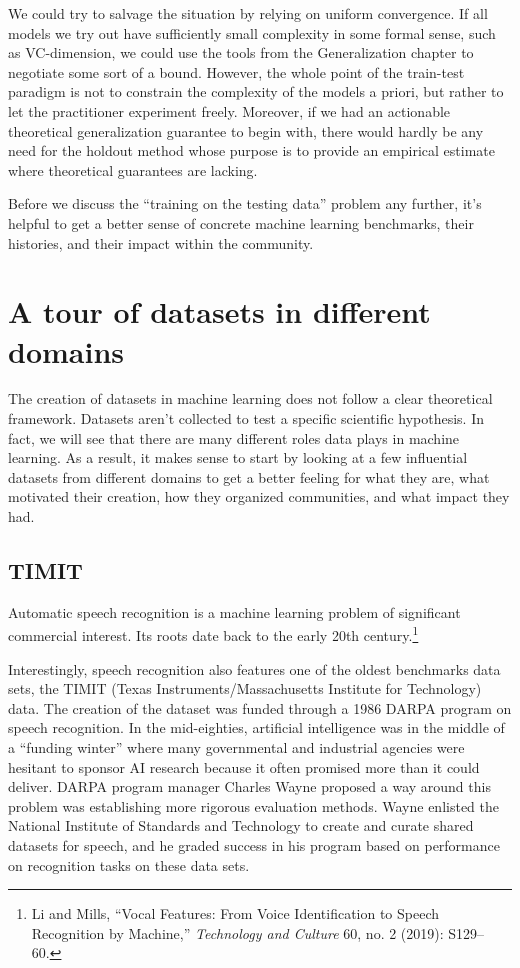 \documentclass{tufte-book}
\begin{document}
We could try to salvage the situation by relying on uniform convergence.
If all models we try out have sufficiently small complexity in some
formal sense, such as VC-dimension, we could use the tools from the
Generalization chapter to negotiate some sort of a bound. However, the
whole point of the train-test paradigm is not to constrain the
complexity of the models a priori, but rather to let the practitioner
experiment freely. Moreover, if we had an actionable theoretical
generalization guarantee to begin with, there would hardly be any need
for the holdout method whose purpose is to provide an empirical estimate
where theoretical guarantees are lacking.

Before we discuss the ``training on the testing data'' problem any
further, it's helpful to get a better sense of concrete machine learning
benchmarks, their histories, and their impact within the community.

\hypertarget{a-tour-of-datasets-in-different-domains}{%
\section{A tour of datasets in different
domains}\label{a-tour-of-datasets-in-different-domains}}

The creation of datasets in machine learning does not follow a clear
theoretical framework. Datasets aren't collected to test a specific
scientific hypothesis. In fact, we will see that there are many
different roles data plays in machine learning. As a result, it makes
sense to start by looking at a few influential datasets from different
domains to get a better feeling for what they are, what motivated their
creation, how they organized communities, and what impact they had.

\hypertarget{timit}{%
\subsection{TIMIT}\label{timit}}

Automatic speech recognition is a machine learning problem of
significant commercial interest. Its roots date back to the early 20th
century.\footnote{Li and Mills, {``Vocal Features: From Voice
  Identification to Speech Recognition by Machine,''} \emph{Technology
  and Culture} 60, no. 2 (2019): S129--60.}

Interestingly, speech recognition also features one of the oldest
benchmarks data sets, the TIMIT (Texas Instruments/Massachusetts
Institute for Technology) data. The creation of the dataset was funded
through a 1986 DARPA program on speech recognition. In the mid-eighties,
artificial intelligence was in the middle of a ``funding winter'' where
many governmental and industrial agencies were hesitant to sponsor AI
research because it often promised more than it could deliver. DARPA
program manager Charles Wayne proposed a way around this problem was
establishing more rigorous evaluation methods. Wayne enlisted the
National Institute of Standards and Technology to create and curate
shared datasets for speech, and he graded success in his program based
on performance on recognition tasks on these data sets.
\end{document}
